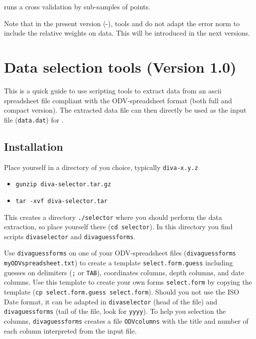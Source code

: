  runs a cross validation by sub-samples of points.


Note that in the present version (\diva-\divaversion), tools   and   
do not adapt the error norm to include the relative weights on data. This will be introduced in the next versions.



\section{Data selection tools (Version 1.0)}


This is a quick guide to use scripting tools to extract data from an ascii spreadsheet file compliant with the ODV-spreadsheet format (both full and compact version). The extracted data file can then directly be used as the input file ({\tt data.dat}) for \diva.

\subsection{Installation} 


Place yourself in a directory of you choice, typically {\tt diva-x.y.z}
\begin{itemize}
\item
 {\tt gunzip diva-selector.tar.gz}
 \item 
 {\tt tar -xvf diva-selector.tar} 
 \end{itemize}
This creates a directory {\tt ./selector} where you should perform the data extraction, so place yourself there ({\tt cd selector}). In this directory you find scripts {\tt divaselector} and {\tt divaguessforms}.

Use {\tt divaguessforms} on one of your ODV-spreadsheet files 
({\tt divaguess\-forms myODV\-spread\-sheet\-.txt})
to create a template {\tt select.form.guess} including
guesses on delimiters ({\tt ;} or {\tt TAB}), coordinates columns, depth columns, and date columns. Use this template to create your own forms {\tt select.form} by copying the template ({\tt cp select.form.guess select.form}).
Should you not use the ISO Date format, it can be adapted in {\tt diva\-selector} (head of the file) and {\tt diva\-guessforms} (tail of the file, look for {\tt yyyy}). To help you selection the columns, {\tt diva\-guessforms} creates a file {\tt ODVcolumns} with the title and number of each column interpreted from the input file.
 
